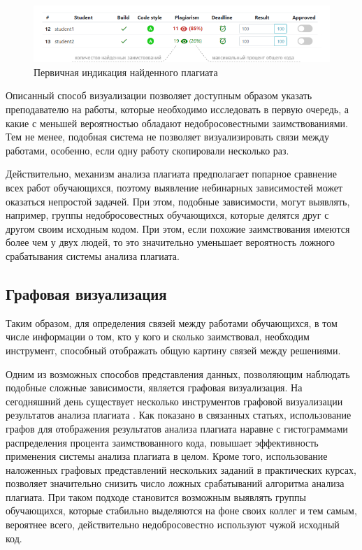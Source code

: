 \documentclass[a4paper,14pt]{extarticle}
\begin{document}
\begin{figure}[h!]
\centering
\includegraphics[width=1.0\textwidth]{plagiarism_indication.png}
\caption{Первичная индикация найденного плагиата}
\label{fig:plagiarismIndication}
\end{figure}

Описанный способ визуализации позволяет доступным образом указать преподавателю на работы, которые необходимо исследовать в первую очередь, а какие с меньшей вероятностью обладают недобросовестными заимствованиями. Тем не менее, подобная система не позволяет визуализировать связи между работами, особенно, если одну работу скопировали несколько раз.

Действительно, механизм анализа плагиата предполагает попарное сравнение всех работ обучающихся, поэтому выявление небинарных зависимостей может оказаться непростой задачей. При этом, подобные зависимости, могут выявлять, например, группы недобросовестных обучающихся, которые делятся друг с другом своим исходным кодом. При этом, если похожие заимствования имеются более чем у двух людей, то это значительно уменьшает вероятность ложного срабатывания системы анализа плагиата.

\subsection{Графовая визуализация}

Таким образом, для определения связей между работами обучающихся, в том числе информации о том, кто у кого и сколько заимствовал, необходим инструмент, способный отображать общую картину связей между решениями.

Одним из возможных способов представления данных, позволяющим наблюдать подобные сложные зависимости, является графовая визуализация. На сегодняшний день существует несколько инструментов графовой визуализации результатов анализа плагиата \citep{plagiarismGraph}\citep{graphVisualizationCompetition}. Как показано в связанных статьях, использование графов для отображения результатов анализа плагиата наравне с гистограммами распределения процента заимствованного кода, повышает эффективность применения системы анализа плагиата в целом. Кроме того, использование наложенных графовых представлений нескольких заданий в практических курсах, позволяет значительно снизить число ложных срабатываний алгоритма анализа плагиата. При таком подходе становится возможным выявлять группы обучающихся, которые стабильно выделяются на фоне своих коллег и тем самым, вероятнее всего, действительно недобросовестно используют чужой исходный код.
\end{document}
